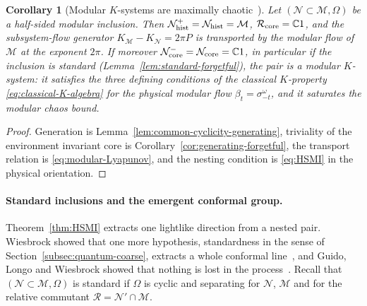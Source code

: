 \documentclass[a4paper,11pt]{article}
\newtheorem{corollary}[theorem]{Corollary}
\theoremstyle{definition}
\newcommand{\mR}{\mathcal{R}}
\newcommand{\mN}{\mathcal{N}}
\newcommand{\mM}{\mathcal{M}}
\begin{document}
\begin{corollary}[Modular $K$-systems are maximally chaotic~{\cite{ouseph2024local}}]\label{cor:maximal-chaos-K-system}
Let $(\mN\subset\mM,\Omega)$ be a half-sided modular inclusion. Then $\mN_{\rm hist}^{+}=\mN_{\rm hist}=\mM$, $\mR_{\rm core}=\mathbb C1$, and the subsystem-flow generator $K_{\mM}-K_{\mN}=2\pi P$ is transported by the modular flow of $\mM$ at the exponent $2\pi$. If moreover $\mN_{\rm core}^{-}=\mN_{\rm core}=\mathbb C1$, in particular if the inclusion is standard (Lemma~\ref{lem:standard-forgetful}), the pair is a modular $K$-system: it satisfies the three defining conditions of the classical $K$-property \eqref{eq:classical-K-algebra} for the physical modular flow $\beta_t=\sigma^\omega_{-t}$, and it saturates the modular chaos bound.
\end{corollary}
\begin{proof}
Generation is Lemma~\ref{lem:common-cyclicity-generating}, triviality of the environment invariant core is Corollary~\ref{cor:generating-forgetful}, the transport relation is \eqref{eq:modular-Lyapunov}, and the nesting condition is \eqref{eq:HSMI} in the physical orientation.
\end{proof}

\paragraph{Standard inclusions and the emergent conformal group.}
Theorem~\ref{thm:HSMI} extracts one lightlike direction from a nested pair. Wiesbrock showed that one more hypothesis, standardness in the sense of Section~\ref{subsec:quantum-coarse}, extracts a whole conformal line~\cite{Wiesbrock1993b}, and Guido, Longo and Wiesbrock showed that nothing is lost in the process~\cite{GuidoLongoWiesbrock1998}. Recall that $(\mN\subset\mM,\Omega)$ is standard if $\Omega$ is cyclic and separating for $\mN$, $\mM$ and for the relative commutant $\mR=\mN'\cap\mM$.
\end{document}
